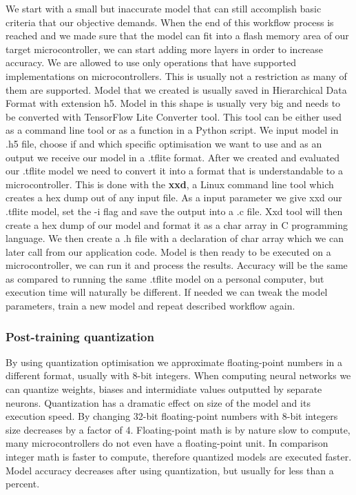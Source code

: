 We start with a small but inaccurate model that can still accomplish basic criteria that our objective demands.
When the end of this workflow process is reached and we made sure that the model can fit into a flash memory area of our target microcontroller, we can start adding more layers in order to increase accuracy.
We are allowed to use only operations that have supported implementations on microcontrollers.
This is usually not a restriction as many of them are supported.
Model that we created is usually saved in Hierarchical Data Format with extension h5.
Model in this shape is usually very big and needs to be converted with TensorFlow Lite Converter tool.
This tool can be either used as a command line tool or as a function in a Python script.
We input model in .h5 file, choose if and which specific optimisation we want to use and as an output we receive our model in a .tflite format.
After we created and evaluated our .tflite model we need to convert it into a format that is understandable to a microcontroller.
This is done with the \textbf{xxd}, a Linux command line tool which creates a hex dump out of any input file.
As a input parameter we give xxd our .tflite model, set the -i flag and save the output into a .c file.
Xxd tool will then create a hex dump of our model and format it as a char array in C programming language. 
We then create a .h file with a declaration of char array which we can later call from our application code.
Model is then ready to be executed on a microcontroller, we can run it and process the results.
Accuracy will be the same as compared to running the same .tflite model on a personal computer, but execution time will naturally be different.
If needed we can tweak the model parameters, train a new model and repeat described workflow again.


\subsubsection{ Post-training quantization}

By using quantization optimisation we approximate floating-point numbers in a different format, usually with 8-bit integers.
When computing neural networks we can quantize weights, biases and intermidiate values outputted by separate neurons. 
Quantization has a dramatic effect on size of the model and its execution speed.
By changing 32-bit floating-point numbers with 8-bit integers size decreases by a factor of 4.
Floating-point math is by nature slow to compute, many microcontrollers do not even have a floating-point unit.
In comparison integer math is faster to compute, therefore quantized models are executed faster.
Model accuracy decreases after using quantization, but usually for less than a percent.
 

